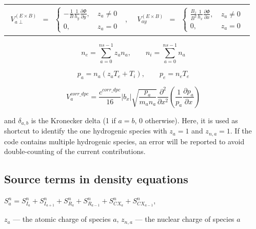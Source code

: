\documentclass[a4paper,10pt]{report}
\begin{document}
\begin{tabular}{cc}
$\begin{matrix}
V_{a \perp}^{\left( E \times B \right)} & =
& \left\{
\begin{matrix}
-\frac{1}{B} \frac{1}{h_y} \frac{\partial \Phi}{\partial y}, & \ z_a \neq 0 \\
0, & \ z_a = 0
\end{matrix} \right.
\end{matrix}$
,&
$\begin{matrix}
V_{ay}^{\left( E \times B \right)} & =
& \left\{
\begin{matrix}
\frac{B_z}{B^2} \frac{1}{h_x} \frac{\partial \Phi}{\partial x}, & \ z_a \neq 0 \\
0, & \ z_a = 0
\end{matrix} \right.
\end{matrix}$
\end{tabular}

\begin{equation}
n_e = \sum \limits^{ns-1}_{a=0} z_a n_a, \qquad
n_i = \sum \limits^{ns-1}_{a=0} n_a
\end{equation}

\begin{equation}
p_a = n_a \left( z_a T_e + T_i \right), \qquad
p_e = n_e T_e
\end{equation}

\begin{equation}
V_a^{corr\_dpc} = \frac{c^{corr\_dpc}}{16} \left| b_x \right| \sqrt{ \frac{p_a}{m_a n_a} } \frac{\partial^2}{\partial x^2} \left( \frac{1}{p_a} \frac{\partial p_a}{\partial x} \right)
\end{equation}

and $\delta_{a,b}$ is the Kronecker delta (1 if $a=b$, 0 otherwise). Here, it is used as shortcut to identify the one hydrogenic species with $z_a = 1$ and $z_{n,a} = 1$. If the code contains multiple hydrogenic species, an error will be reported to avoid double-counting of the current contributions.

\subsection{Source terms in density equations}

{\centering}
$S_a^n=S_{I_a}^n+S_{I_{a+1}}^n+S_{R_a}^n+S_{R_{a-1}}^n+S_{CX_a}^n+S_{CX_{a-1}}^n$,
{\centering}



$z_a$ --- the atomic charge of species $a$,
$z_{n,a}$ --- the nuclear charge of species $a$
\end{document}

